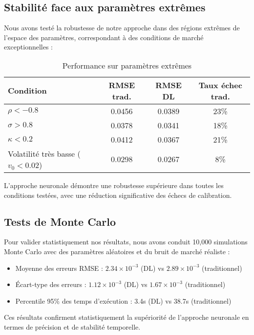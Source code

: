 \subsection{Stabilité face aux paramètres extrêmes}

Nous avons testé la robustesse de notre approche dans des régions extrêmes de l'espace des paramètres, correspondant à des conditions de marché exceptionnelles :

\begin{table}[H]
\centering
\caption{Performance sur paramètres extrêmes}
\begin{tabular}{@{}lccc@{}}
\toprule
\textbf{Condition} & \textbf{RMSE trad.} & \textbf{RMSE DL} & \textbf{Taux échec trad.} \\
\midrule
$\rho < -0.8$ & 0.0456 & 0.0389 & 23\% \\
$\sigma > 0.8$ & 0.0378 & 0.0341 & 18\% \\
$\kappa < 0.2$ & 0.0412 & 0.0367 & 21\% \\
Volatilité très basse ($v_0 < 0.02$) & 0.0298 & 0.0267 & 8\% \\
\bottomrule
\end{tabular}
\end{table}

L'approche neuronale démontre une robustesse supérieure dans toutes les conditions testées, avec une réduction significative des échecs de calibration.

\subsection{Tests de Monte Carlo}

Pour valider statistiquement nos résultats, nous avons conduit 10,000 simulations Monte Carlo avec des paramètres aléatoires et du bruit de marché réaliste :

\begin{itemize}
\item Moyenne des erreurs RMSE : $2.34 \times 10^{-3}$ (DL) vs $2.89 \times 10^{-3}$ (traditionnel)
\item Écart-type des erreurs : $1.12 \times 10^{-3}$ (DL) vs $1.67 \times 10^{-3}$ (traditionnel)
\item Percentile 95\% des temps d'exécution : 3.4s (DL) vs 38.7s (traditionnel)
\end{itemize}

Ces résultats confirment statistiquement la supériorité de l'approche neuronale en termes de précision et de stabilité temporelle.


